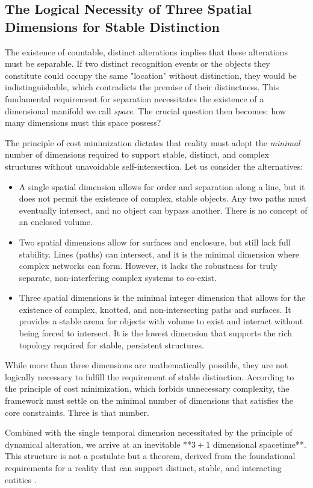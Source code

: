 \subsection{The Logical Necessity of Three Spatial Dimensions for Stable Distinction}
The existence of countable, distinct alterations implies that these alterations must be separable. If two distinct recognition events or the objects they constitute could occupy the same "location" without distinction, they would be indistinguishable, which contradicts the premise of their distinctness. This fundamental requirement for separation necessitates the existence of a dimensional manifold we call \emph{space}. The crucial question then becomes: how many dimensions must this space possess?

The principle of cost minimization dictates that reality must adopt the \emph{minimal} number of dimensions required to support stable, distinct, and complex structures without unavoidable self-intersection. Let us consider the alternatives:
\begin{itemize}
    \item A single spatial dimension allows for order and separation along a line, but it does not permit the existence of complex, stable objects. Any two paths must eventually intersect, and no object can bypass another. There is no concept of an enclosed volume.
    \item Two spatial dimensions allow for surfaces and enclosure, but still lack full stability. Lines (paths) can intersect, and it is the minimal dimension where complex networks can form. However, it lacks the robustness for truly separate, non-interfering complex systems to co-exist.
    \item Three spatial dimensions is the minimal integer dimension that allows for the existence of complex, knotted, and non-intersecting paths and surfaces. It provides a stable arena for objects with volume to exist and interact without being forced to intersect. It is the lowest dimension that supports the rich topology required for stable, persistent structures.
\end{itemize}
While more than three dimensions are mathematically possible, they are not logically necessary to fulfill the requirement of stable distinction. According to the principle of cost minimization, which forbids unnecessary complexity, the framework must settle on the minimal number of dimensions that satisfies the core constraints. Three is that number.

Combined with the single temporal dimension necessitated by the principle of dynamical alteration, we arrive at an inevitable **\(3+1\) dimensional spacetime**. This structure is not a postulate but a theorem, derived from the foundational requirements for a reality that can support distinct, stable, and interacting entities \parencite{Tegmark1997}.

